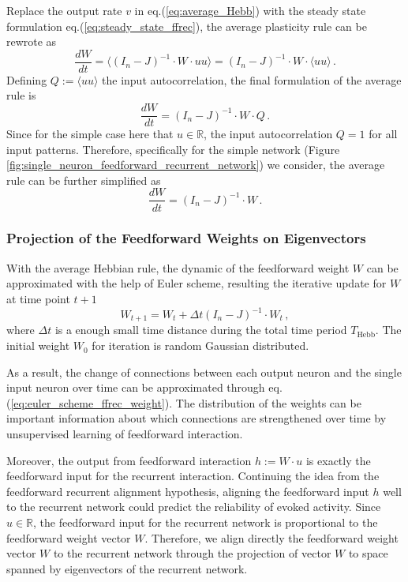 \documentclass[11pt]{article}
\begin{document}
	Replace the output rate $v$ in eq.(\ref{eq:average_Hebb}) with the steady state formulation eq.(\ref{eq:steady_state_ffrec}), the average plasticity rule can be rewrote as 
		\begin{equation}
			\frac{dW}{dt} = \langle (I_n - J)^{-1} \cdot W \cdot u u \rangle = (I_n - J)^{-1} \cdot W \cdot \langle uu \rangle \, .
		\end{equation}
	Defining $Q := \langle uu \rangle$ the input autocorrelation, the final formulation of the average rule is
		\begin{equation}
			\frac{dW}{dt} = (I_n - J)^{-1} \cdot W \cdot Q \, .
		\end{equation}
	Since for the simple case here that $u \in \mathbb{R}$, the input autocorrelation $Q = 1$ for all input patterns. Therefore, specifically for the simple network (Figure \ref{fig:single_neuron_feedforward_recurrent_network}) we consider, the average rule can be further simplified as
		\begin{equation} \label{eq:final_hebb_ff_weight}
			\frac{dW}{dt} = (I_n - J)^{-1} \cdot W \, .
		\end{equation} 

	\subsubsection{Projection of the Feedforward Weights on Eigenvectors}
	With the average Hebbian rule, the dynamic of the feedforward weight $W$ can be approximated with the help of Euler scheme, resulting the iterative update for $W$ at time point $t+1$
		\begin{equation} \label{eq:euler_scheme_ffrec_weight}
			W_{t+1} = W_t + \Delta t (I_n - J)^{-1} \cdot W_t \, , 
		\end{equation}
	where $\Delta t$ is a enough small time distance during the total time period $T_{\text{Hebb}}$. The initial weight $W_0$ for iteration is random Gaussian distributed.
	
	As a result, the change of connections between each output neuron and the single input neuron over time can be approximated through eq.(\ref{eq:euler_scheme_ffrec_weight}). The distribution of the weights can be important information about which connections are strengthened over time by unsupervised learning of feedforward interaction. 
	
	Moreover, the output from feedforward interaction $h := W \cdot u$ is exactly the feedforward input for the recurrent interaction.  Continuing the idea from the feedforward recurrent alignment hypothesis, aligning the feedforward input $h$ well to the recurrent network could predict the reliability of evoked activity. Since $u \in \mathbb{R}$, the feedforward input for the recurrent network is proportional to the feedforward weight vector $W$. Therefore, we align directly the feedforward weight vector $W$ to the recurrent network through the projection of vector $W$ to space spanned by eigenvectors of the recurrent network. 
	
\end{document}
